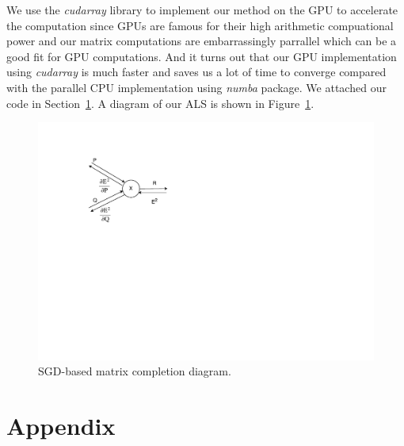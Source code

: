 \documentclass{article}
\begin{document}
We use the \emph{cudarray} library to implement our method on the GPU to accelerate the computation since GPUs are famous for their high arithmetic compuational power and our matrix computations are embarrassingly parrallel which can be a good fit for GPU computations. And it turns out that our GPU implementation using \emph{cudarray} is much faster and saves us a lot of time to converge compared with the parallel CPU implementation using \emph{numba} package. We attached our code in Section~\ref{code}.  A diagram of our ALS is shown in Figure~\ref{fig:sgd}.
\begin{figure}
  \centering
  \includegraphics[scale=0.8]{SGD}
  \caption{SGD-based matrix completion diagram.\label{fig:sgd}}
\end{figure}

\section{Appendix}
\label{code}
\end{document}
